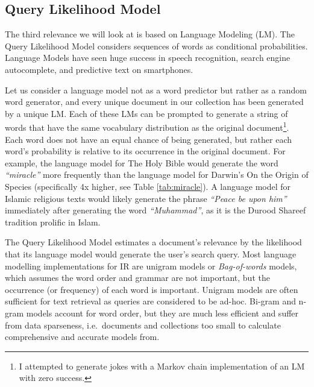 

\subsection{Query Likelihood Model}
The third relevance we will look at is based on Language Modeling (LM). The Query Likelihood Model considers sequences of words as conditional probabilities. Language Models have seen huge success in speech recognition, search engine autocomplete, and predictive text on smartphones. 

Let us consider a language model not as a word predictor but rather as a random word generator, and every unique document in our collection has been generated by a unique LM. Each of these LMs can be prompted to generate a string of words that have the same vocabulary distribution as the original document\footnote{I attempted to generate jokes with a Markov chain implementation of an LM with zero success.}. Each word does not have an equal chance of being generated, but rather each word's probability is relative to its occurrence in the original document. For example, the language model for The Holy Bible would generate the word \textit{``miracle''} more frequently than the language model for Darwin's On the Origin of Species (specifically 4x higher, see Table \ref{tab:miracle}). A language model for Islamic religious texts would likely generate the phrase \textit{``Peace be upon him''} immediately after generating the word \textit{``Muhammad''}, as it is the Durood Shareef tradition prolific in Islam. 

The Query Likelihood Model estimates a document's relevance by the likelihood that its language model would generate the user's search query. Most language modelling implementations for IR are unigram models or \textit{Bag-of-words} models, which assumes the word order and grammar are not important, but the occurrence (or frequency) of each word is important. Unigram models are often sufficient for text retrieval as queries are considered to be ad-hoc. Bi-gram and n-gram models account for word order, but they are much less efficient and suffer from data sparseness, i.e.\ documents and collections too small to calculate comprehensive and accurate models from.

